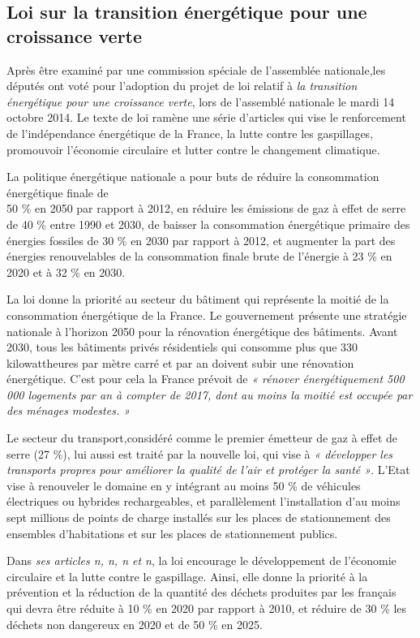 \subsection{Loi sur la transition énergétique pour une croissance verte}


\smallbreak
Après être examiné par une commission spéciale de l'assemblée nationale,les députés ont voté pour l’adoption du projet de loi relatif à \textit{la transition énergétique pour une croissance verte}, lors de l’assemblé nationale le mardi 14 octobre 2014. Le texte de loi ramène une série d’articles qui vise le renforcement de l’indépendance énergétique de la France, la lutte contre les gaspillages, promouvoir l’économie circulaire et lutter contre le changement climatique.


\smallbreak
La politique énergétique nationale a pour buts de réduire la consommation énergétique finale de\\50 \% en 2050 par rapport à 2012, en réduire les émissions de gaz à effet de serre de 40 \% entre 1990 et 2030, de baisser la consommation énergétique primaire des énergies fossiles de 30 \% en 2030 par rapport à 2012, et augmenter la part des énergies renouvelables de la consommation finale brute de l’énergie à 23 \% en 2020 et à 32 \% en 2030.


\smallbreak
La loi donne la priorité au secteur du bâtiment qui représente la moitié de la consommation énergétique de la France. Le gouvernement présente une stratégie nationale à l’horizon 2050 pour la rénovation énergétique des bâtiments. Avant 2030, tous les bâtiments privés résidentiels qui consomme plus que 330 kilowattheures par mètre carré et par an doivent subir une rénovation énergétique. C’est pour cela la France prévoit de \textit{« rénover énergétiquement 500 000 logements par an à compter de 2017, dont au moins la moitié est occupée par des ménages modestes. »}


\smallbreak
Le secteur du transport,considéré comme le premier émetteur de gaz à effet de serre (27 \%), lui aussi est traité par la nouvelle loi, qui vise à \textit{« développer les transports propres pour améliorer la qualité de l’air et protéger la santé »}. L’Etat vise à renouveler le domaine en y intégrant au moins 50 \% de véhicules électriques ou hybrides rechargeables, et parallèlement l’installation d’au moins sept millions de points de charge installés sur les places de stationnement des ensembles d’habitations et sur les places de stationnement publics.


\smallbreak
Dans \textit{ses articles n, n, n et n}, la loi encourage le développement de l’économie circulaire et la lutte contre le gaspillage. Ainsi, elle donne la priorité à la prévention et la réduction de la quantité des déchets produites par les français qui devra être réduite à 10 \%  en 2020 par rapport à 2010, et réduire de 30 \% les déchets non dangereux en 2020 et de 50 \% en 2025.


